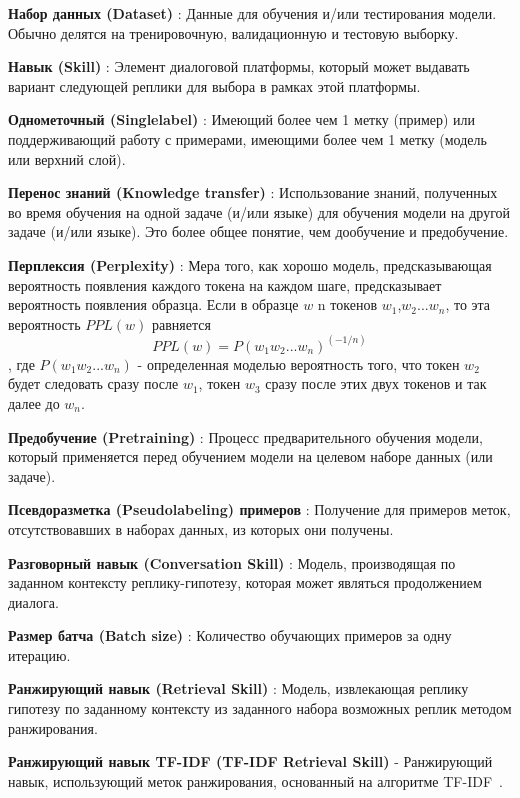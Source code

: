 \textbf{Набор данных (Dataset)} : Данные для обучения и/или тестирования модели. Обычно делятся на тренировочную, валидационную и тестовую выборку. 

\textbf{Навык (Skill)} : Элемент диалоговой платформы, который может выдавать вариант следующей реплики для выбора в рамках этой платформы. 

\textbf{Однометочный (Singlelabel)} : Имеющий более чем 1 метку (пример) или поддерживающий работу с примерами, имеющими более чем 1 метку (модель или верхний слой).

\textbf{Перенос знаний (Knowledge transfer)} : Использование знаний, полученных во время обучения на одной задаче (и/или языке) для обучения модели на другой задаче (и/или языке). Это более общее понятие, чем дообучение и предобучение.

\textbf{Перплексия (Perplexity)} : Мера того, как хорошо модель, предсказывающая вероятность появления каждого токена на каждом шаге, предсказывает вероятность появления образца. Если в образце $w$ n токенов $w_1$,$w_2$...$w_n$, то эта вероятность $PPL(w)$ равняется
\begin{equation} 
PPL(w) = P(w_1w_2... w_n)^{(-1/n)}
\end{equation},
где $P(w_1w_2... w_n)$ - определенная моделью вероятность того, что токен $w_2$ будет следовать сразу после $w_1$, токен $w_3$ сразу после этих двух токенов и так далее до $w_n$. 

\textbf{Предобучение (Pretraining)} : Процесс предварительного обучения модели, который
применяется перед обучением модели на целевом наборе данных (или задаче). 

\textbf{Псевдоразметка (Pseudolabeling) примеров} : Получение для примеров меток, отсутствовавших в наборах данных, из которых они получены.

\textbf{Разговорный навык (Conversation Skill)} : Модель, производящая по заданном контексту реплику-гипотезу, которая может являться продолжением диалога.

\textbf{Размер батча (Batch size)} : Количество обучающих примеров за одну итерацию.

\textbf{Ранжирующий навык (Retrieval Skill)} : Модель, извлекающая реплику гипотезу по заданному контексту из заданного набора возможных реплик методом ранжирования.

\textbf{Ранжирующий навык TF-IDF (TF-IDF Retrieval Skill)} - Ранжирующий навык, использующий меток ранжирования, основанный на алгоритме TF-IDF~\cite{tfidf}. 

